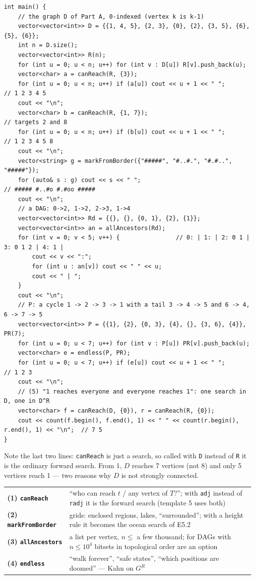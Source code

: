 \begin{lstlisting}[style=cpp]
int main() {
    // the graph D of Part A, 0-indexed (vertex k is k-1)
    vector<vector<int>> D = {{1, 4, 5}, {2, 3}, {0}, {2}, {3, 5}, {6}, {5}, {6}};
    int n = D.size();
    vector<vector<int>> R(n);
    for (int u = 0; u < n; u++) for (int v : D[u]) R[v].push_back(u);
    vector<char> a = canReach(R, {3});
    for (int u = 0; u < n; u++) if (a[u]) cout << u + 1 << " ";      // 1 2 3 4 5
    cout << "\n";
    vector<char> b = canReach(R, {1, 7});                              // targets 2 and 8
    for (int u = 0; u < n; u++) if (b[u]) cout << u + 1 << " ";      // 1 2 3 4 5 8
    cout << "\n";
    vector<string> g = markFromBorder({"#####", "#..#.", "#.#..", "#####"});
    for (auto& s : g) cout << s << " ";                               // ##### #..#o #.#oo #####
    cout << "\n";
    // a DAG: 0->2, 1->2, 2->3, 1->4
    vector<vector<int>> Rd = {{}, {}, {0, 1}, {2}, {1}};
    vector<vector<int>> an = allAncestors(Rd);
    for (int v = 0; v < 5; v++) {                // 0: | 1: | 2: 0 1 | 3: 0 1 2 | 4: 1 |
        cout << v << ":";
        for (int u : an[v]) cout << " " << u;
        cout << " | ";
    }
    cout << "\n";
    // P: a cycle 1 -> 2 -> 3 -> 1 with a tail 3 -> 4 -> 5 and 6 -> 4, 6 -> 7 -> 5
    vector<vector<int>> P = {{1}, {2}, {0, 3}, {4}, {}, {3, 6}, {4}}, PR(7);
    for (int u = 0; u < 7; u++) for (int v : P[u]) PR[v].push_back(u);
    vector<char> e = endless(P, PR);
    for (int u = 0; u < 7; u++) if (e[u]) cout << u + 1 << " ";      // 1 2 3
    cout << "\n";
    // (5) "1 reaches everyone and everyone reaches 1": one search in D, one in D^R
    vector<char> f = canReach(D, {0}), r = canReach(R, {0});
    cout << count(f.begin(), f.end(), 1) << " " << count(r.begin(), r.end(), 1) << "\n";  // 7 5
}
\end{lstlisting}

Note the last two lines: \texttt{canReach} is just a search, so called with \texttt{D} instead of \texttt{R} it is the ordinary forward search. From 1, $D$ reaches 7 vertices (not 8) and only 5 vertices reach 1 --- two reasons why $D$ is not strongly connected.

\begin{insightbox}
\renewcommand{\arraystretch}{1.25}
\begin{tabularx}{\linewidth}{@{}>{\bfseries}l X@{}}
(1) \texttt{canReach} & ``who can reach $t$ / any vertex of $T$?''; with \texttt{adj} instead of \texttt{radj} it is the forward search (template 5 uses both) \\
(2) \texttt{markFromBorder} & grids: enclosed regions, lakes, ``surrounded''; with a height rule it becomes the ocean search of E5.2 \\
(3) \texttt{allAncestors} & a list per vertex, $n \le$ a few thousand; for DAGs with $n \le 10^4$ bitsets in topological order are an option \\
(4) \texttt{endless} & ``walk forever'', ``safe states'', ``which positions are doomed'' --- Kahn on $G^R$ \\
\end{tabularx}
\end{insightbox}

